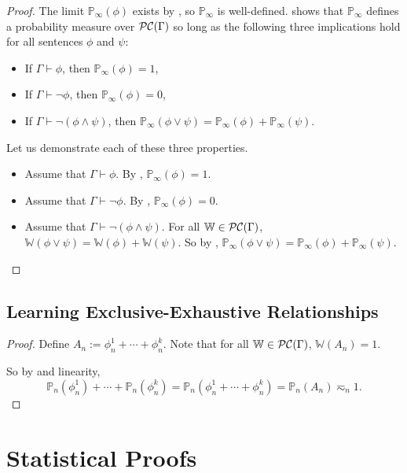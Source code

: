 \documentclass[authordate,onecolumn,noenvironments]{miri-tech-article}
\numberwithin{equation}{subsection}
\newcommand{\aff}{A}
\newcommand{\BelState}{\mathbb{P}}
\newcommand{\pt}{\BelState}
\newcommand{\cworlds}{\mathcal{P\-C}} %
\newcommand{\World}{\mathbb{W}}
\newcommand{\Theory}{\Gamma}
\begin{document}
\begin{proof}
The limit $\pt_\infty(\phi)$ exists by , so $\pt_\infty$ is well-defined. \citet{Gaifman:1964} shows that $\pt_\infty$ defines a probability measure over $\cworlds(\Theory)$ so long as the following three implications hold for all sentences $\phi$ and $\psi$:
  \begin{itemize}
    \item If $\Theory \vdash \phi$, then $\pt_\infty(\phi) = 1$,
    \item If $\Theory \vdash \lnot \phi$, then $\pt_\infty(\phi) = 0$,
    \item If $\Theory \vdash \lnot(\phi \land \psi)$, then $\pt_\infty(\phi \lor \psi) = \pt_\infty(\phi) + \pt_\infty(\psi)$.
  \end{itemize}
Let us demonstrate each of these three properties.
\begin{itemize}
  \item Assume that $\Theory \vdash \phi$.  By , $\pt_\infty(\phi) = 1$.
  \item Assume that $\Theory \vdash \lnot \phi$.  By , $\pt_\infty(\phi) = 0$.
  \item Assume that $\Theory \vdash \lnot(\phi \land \psi)$.  For all $\World \in \cworlds(\Theory)$, $\World(\phi \vee \psi) = \World(\phi) + \World(\psi)$.  So by , $\pt_\infty(\phi \vee \psi) = \pt_\infty(\phi) + \pt_\infty(\psi)$.
\end{itemize}

\end{proof}

\subsection{Learning Exclusive-Exhaustive Relationships}\label{app:lex}

\restatelex*

\begin{proof}
  Define $\aff_n := \phi_n^1 + \cdots + \phi_n^k$.  Note that for all $\World \in \cworlds(\Theory)$, $\World(\aff_n) = 1$.  
  

  So by  and linearity,
  \[  \pt_n(\phi_n^1) + \cdots + \pt_n(\phi_n^k ) = \pt_n(\phi_n^1 + \cdots + \phi_n^k ) =     \pt_n(\aff_n) \eqsim_n 1. \]

\end{proof}




\section{Statistical Proofs}\label{app:statisticalproofs}
\end{document}
